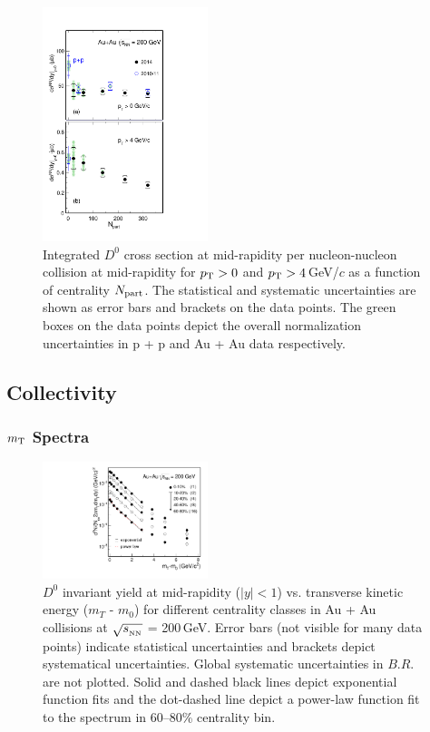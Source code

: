 \documentclass[%
 reprint,	
 amsmath,amssymb,
 aps,
 prc,
]{revtex4-1}
\begin{document}
\begin{figure}
\centering
\includegraphics[width=0.43\textwidth]{fig/Xsection_D0.pdf}
\caption{Integrated $D^{0}$ cross section at mid-rapidity per nucleon-nucleon collision at mid-rapidity for $p_{\rm T}>0$ and $p_{\rm T}>4$\,GeV/$c$ as a function of centrality $N_{\rm part}$. The statistical and systematic uncertainties are shown as error bars and brackets on the data points. The green boxes on the data points depict the overall normalization uncertainties in p + p and Au + Au data respectively.}
\label{fig:Xsection_D0} 
\end{figure}

\subsection{\label{result:collectivity}Collectivity}

\subsubsection{\label{result:collectivity:mT}$m_{\rm T}$ Spectra}

\begin{figure}
\centering
\includegraphics[width=0.43\textwidth]{fig/mTFit_D0.pdf}
\caption{$D^{0}$ invariant yield at mid-rapidity ($|y|<1$) vs. transverse kinetic energy ($m_{T}$ - $m_{0}$) for different centrality classes in Au + Au collisions at $\sqrt{s_{_{\rm NN}}}$ = 200\,GeV. Error bars (not visible for many data points) indicate statistical uncertainties and brackets depict systematical uncertainties. Global systematic uncertainties in $B.R.$ are not plotted. Solid and dashed black lines depict exponential function fits and the dot-dashed line depict a power-law function fit to the spectrum in 60--80\% centrality bin.}
\label{fig:mTFit_D0} 
\end{figure}
\end{document}
